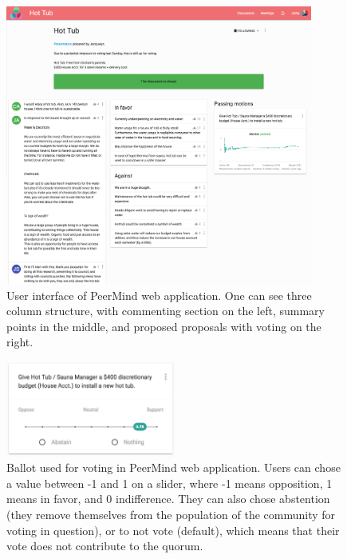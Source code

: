 \documentclass[format=acmsmall, review=true, screen=true, anonymous=true]{acmart}
\begin{document}
\begin{figure}[ht]
\centering
\includegraphics[width=0.9\textwidth]{figures/peermind.png}
\caption{User interface of PeerMind web application. One can see three column structure, with commenting
section on the left, summary points in the middle, and proposed proposals with voting on the right.}
\label{fig:peer-mind}
\end{figure}

\begin{figure}[ht]
\centering
\includegraphics[width=0.5\textwidth]{figures/ballot.png}
\caption{Ballot used for voting in PeerMind web application. Users can chose a value between -1 and 1 on a slider,
where -1 means opposition, 1 means in favor, and 0 indifference. They can also chose abstention (they
remove themselves from the population of the community for voting in question), or to not vote (default), which
means that their vote does not contribute to the quorum.}
\label{fig:ballot}
\end{figure}
\end{document}
